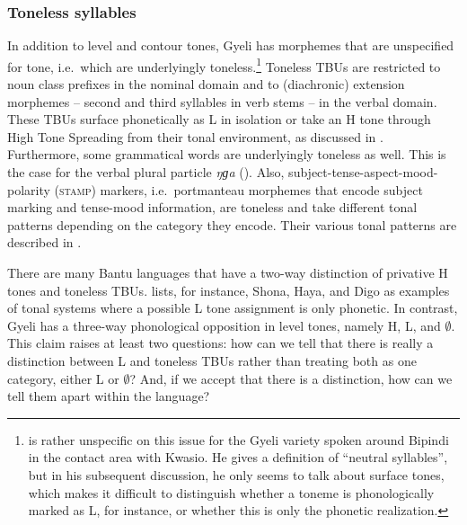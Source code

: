 
\subsubsection{Toneless syllables}
\label{sec:toneless}


In addition to level and contour tones,  Gyeli has morphemes that are unspecified for tone, i.e.\ which are underlyingly toneless.\footnote{\citet{renaud76} is rather unspecific on this issue for the Gyeli variety spoken around Bipindi in the contact area with Kwasio. He gives a definition of ``neutral syllables'', but in his subsequent discussion, he only seems to talk about surface tones, which makes it difficult to distinguish whether a toneme is phonologically marked as L, for instance, or whether this is only the phonetic realization.} Toneless TBUs are restricted to noun class prefixes in the nominal domain and to (diachronic) extension morphemes -- second and third syllables in verb stems -- in the verbal domain. These TBUs surface phonetically as L in isolation or take an H tone through High Tone Spreading from their tonal environment, as discussed in . Furthermore, some grammatical words are underlyingly toneless as well. This is the case for the verbal plural particle {\itshape ŋɡa} (). Also, subject-tense-aspect-mood-polarity (\textsc{stamp}) markers, i.e.\ portmanteau morphemes that encode subject marking and tense-mood information, are toneless and take different tonal patterns depending on the category they encode. Their various tonal patterns are described in .


There are many Bantu languages that have a two-way distinction of privative H tones and toneless TBUs. \citet[239]{hyman2001} lists, for instance, Shona, Haya, and Digo as examples of tonal systems where a possible L tone assignment is only phonetic. In contrast, Gyeli has a three-way phonological opposition in level tones, namely H, L, and $\emptyset$. This claim raises at least two questions: how can we tell that there is really a distinction between L and toneless TBUs rather than treating both as one category, either L or $\emptyset$? And, if we accept that there is a distinction, how can we tell them apart within the language?

